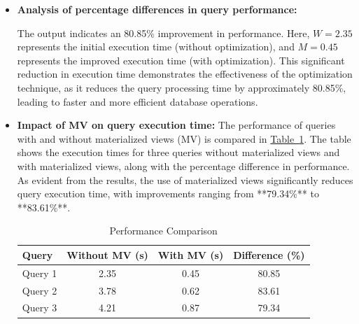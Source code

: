 \begin{enumerate}
\begin{itemize}
 \vspace{.4cm
 }

 \item\textbf{Analysis of percentage differences in query performance:}
 


\vspace{.4cm}

The output indicates an 80.85\% improvement in performance. Here, \( W = 2.35 \) represents the initial execution time (without optimization), and \( M = 0.45 \) represents the improved execution time (with optimization). This significant reduction in execution time demonstrates the effectiveness of the optimization technique, as it reduces the query processing time by approximately 80.85\%, leading to faster and more efficient database operations.\vspace{.4cm}

\item \textbf{Impact of MV on query execution time:} The performance of queries with and without materialized views (MV) is compared in \hyperref[tab:performance]{Table~\ref*{tab:performance}}. The table shows the execution times for three queries without materialized views and with materialized views, along with the percentage difference in performance. As evident from the results, the use of materialized views significantly reduces query execution time, with improvements ranging from **79.34\%** to **83.61\%**.

\begin{table}[h!]
    \centering
    \caption{Performance Comparison}
    \label{tab:performance}
    \begin{tabular}{lccc}
        \toprule
        \rowcolor{blue!10} %
        \textbf{Query} & \textbf{Without MV (s)} & \textbf{With MV (s)} & \textbf{Difference (\%)} \\
        \midrule
        Query 1 & 2.35 & 0.45 & \cellcolor{white!20}80.85 \\
        Query 2 & 3.78 & 0.62 & \cellcolor{gray!10}83.61 \\
        Query 3 & 4.21 & 0.87 & \cellcolor{white!20}79.34 \\
        \bottomrule
    \end{tabular}
\end{table}


\end{itemize}
\end{enumerate}
